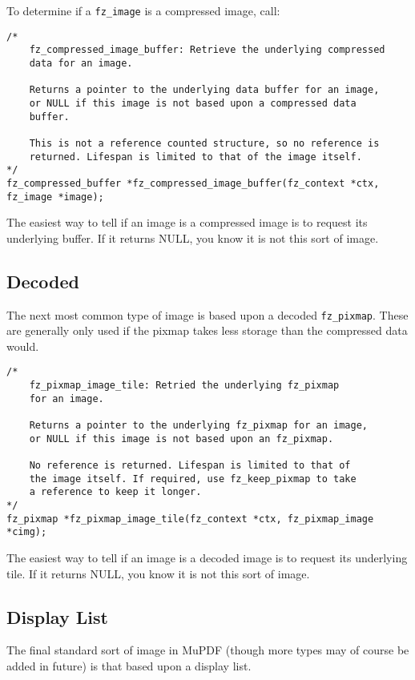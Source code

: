 \documentclass[oneside]{book}
\begin{document}
To determine if a \texttt{fz\_image} is a compressed image, call:

\begin{lstlisting}
/*
	fz_compressed_image_buffer: Retrieve the underlying compressed
	data for an image.

	Returns a pointer to the underlying data buffer for an image,
	or NULL if this image is not based upon a compressed data
	buffer.

	This is not a reference counted structure, so no reference is
	returned. Lifespan is limited to that of the image itself.
*/
fz_compressed_buffer *fz_compressed_image_buffer(fz_context *ctx, fz_image *image);
\end{lstlisting}

The easiest way to tell if an image is a compressed image is to request its underlying buffer. If it returns NULL, you know it is not this sort of image.

\subsection{Decoded}

The next most common type of image is based upon a decoded \texttt{fz\_pixmap}. These are generally only used if the pixmap takes less storage than the compressed data would.

\begin{lstlisting}
/*
	fz_pixmap_image_tile: Retried the underlying fz_pixmap
	for an image.

	Returns a pointer to the underlying fz_pixmap for an image,
	or NULL if this image is not based upon an fz_pixmap.

	No reference is returned. Lifespan is limited to that of
	the image itself. If required, use fz_keep_pixmap to take
	a reference to keep it longer.
*/
fz_pixmap *fz_pixmap_image_tile(fz_context *ctx, fz_pixmap_image *cimg);
\end{lstlisting}

The easiest way to tell if an image is a decoded image is to request its underlying tile. If it returns NULL, you know it is not this sort of image.

\subsection{Display List}

The final standard sort of image in MuPDF (though more types may of course be added in future) is that based upon a display list.
\end{document}
